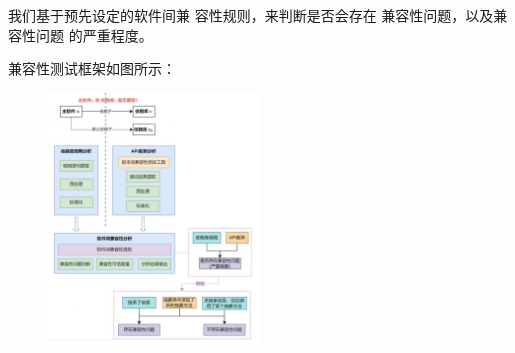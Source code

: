 \documentclass[14pt,a4paper,UTF8,twoside]{article}
\begin{document}
我们基于预先设定的软件间兼
容性规则，来判断是否会存在
兼容性问题，以及兼容性问题
的严重程度。

兼容性测试框架如图所示：

\begin{figure}[H]
    \centering
    \includegraphics[width=0.5\textwidth]{img11/final.png}
    \label{fig:compatibility_test_framework}
\end{figure}
\end{document}

